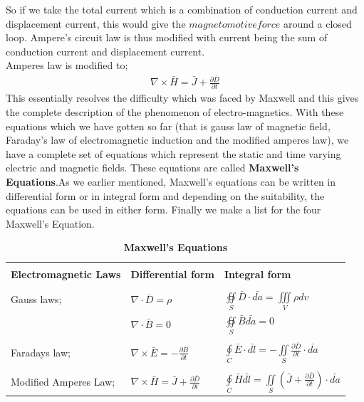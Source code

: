So if we take the total current which is a combination of conduction current and displacement current, this would give the $magnetomotive force$ around a closed loop.
Ampere's circuit law is thus modified with current being the sum of conduction current and displacement current.\\
Amperes law is modified to;
\begin{align}
\nabla\times\bar{H}=\bar{J}+\frac{\partial\bar{D}}{\partial t}
\end{align}
This essentially resolves the difficulty which was faced by Maxwell and this gives the complete description of the phenomenon of electro-magnetics. With these equations which we have gotten so far (that is gauss law of magnetic field, Faraday's law of electromagnetic induction and the modified amperes law), we have a complete set of equations which represent the static and time varying electric and magnetic fields. These equations are called \textbf{Maxwell's Equations}.As we earlier mentioned, Maxwell's equations can be written in differential form or in integral form and depending on the suitability, the equations can be used in either form. Finally we make a list for the four Maxwell's Equation.
\begin{table}[h]
\caption{\textbf{Maxwell's Equations}}
\centering
\begin{tabular}{p{3cm} p{2cm} p{2cm}}
\hline \\
\textbf{Electromagnetic Laws} & \textbf{Differential form} & \textbf{Integral form} \\ [0.5ex]
\hline \\
Gauss laws; & $\nabla\cdot\bar{D}=\rho$ & $\oiint\limits_S\bar{D}\cdot\bar{da}=\iiint\limits_V
\rho dv$\\
& $\nabla\cdot\bar{B}=0$ & $\oiint\limits_S\bar{B}\bar{da}=0$\\
\hline \\

Faradays law; & $\nabla\times\bar{E}=-\frac{\partial\bar{B}}{\partial t}$ & $\oint\limits_C\bar{E}\cdot\bar{dl}=-\iint\limits_S\frac{\partial\bar{D}}{\partial t}\cdot\bar{da}$ \\
\hline \\
Modified Amperes Law; &
$\nabla\times\bar{H}=\bar{J}+\frac{\partial\bar{D}}{\partial t}$ & $\oint\limits_C\bar{H}\bar{dl}=\iint\limits_S(\bar{J}+\frac{\partial\bar{D}}{\partial t})\cdot\bar{da}$ \\
\hline
\end{tabular}
\end{table}

